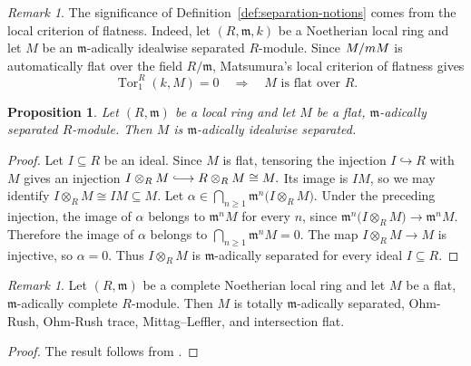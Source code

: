 \documentclass[12pt,reqno]{amsart}
\newtheorem{proposition}[theorem]{Proposition}
\theoremstyle{definition}
\theoremstyle{remark}
\newtheorem{remark}[theorem]{Remark}
\theoremstyle{cited}
\theoremstyle{remark}
\theoremstyle{citeddef}
\DeclareMathOperator{\Tor}{Tor}
\newcommand{\fm}{\mathfrak{m}}
\newcommand{\hooklongrightarrow}
{\lhook\joinrel\longrightarrow}
\begin{document}
	\begin{remark}\label{rem:local-flatness-idealwise}
		The significance of Definition~\ref{def:separation-notions} comes from the local
		criterion of flatness. Indeed, let $(R,\fm,k)$ be a Noetherian local
		ring and let $M$ be an $\fm$-adically idealwise separated $R$-module.
		Since $M/\mathfrak \fm M$ is automatically flat over the field
		$R/\fm$, Matsumura's local criterion of flatness
		\cite[Theorem~22.3]{mat} gives
		\[
		\Tor_1^R(k,M)=0
		\quad\Longrightarrow\quad
		M\text{ is flat over }R.
		\]
	\end{remark}
	
	
	
	\begin{proposition}\label{prop:flat-separated-idealwise}
		Let $(R,\fm)$ be a local ring and let $M$ be a flat, $\fm$-adically
		separated $R$-module. Then $M$ is $\fm$-adically idealwise separated.
	\end{proposition}
	
	\begin{proof}
		Let $I\subseteq R$ be an ideal. Since $M$ is flat, tensoring the
		injection $I\hookrightarrow R$ with $M$ gives an injection
		\(
		I\otimes_RM\hooklongrightarrow R\otimes_RM\cong M.
		\)
		Its image is $IM$, so we may identify
		\(
		I\otimes_RM\cong IM\subseteq M.
		\)
		Let
		\(
		\alpha\in
		\bigcap_{n\geq1}
		\fm^n\bigl(I\otimes_RM\bigr).
		\)
		Under the preceding injection, the image of $\alpha$ belongs to
		$\fm^nM$ for every $n$, since
		\(
		\fm^n\bigl(I\otimes_RM\bigr)
		\to
		\fm^nM.
		\)
		Therefore the image of $\alpha$ belongs to
		\(
		\bigcap_{n\geq1}\fm^nM=0.
		\)
		The map $I\otimes_RM\to M$ is injective, so $\alpha=0$.
		Thus $I\otimes_RM$ is $\fm$-adically separated for every ideal
		$I\subseteq R$.
	\end{proof}
	
	
	\begin{remark}\label{cor:flat-complete-total}
		Let $(R,\fm)$ be a complete Noetherian local ring and let $M$ be a
		flat, $\fm$-adically complete $R$-module. Then $M$ is totally
		$\fm$-adically separated, Ohm-Rush, Ohm-Rush trace, Mittag--Leffler,
		and intersection flat.
	\end{remark}
	
	\begin{proof}
		The result follows from \cite[Corollary~4.3.14]{DET}.
	\end{proof}
	
\end{document}
